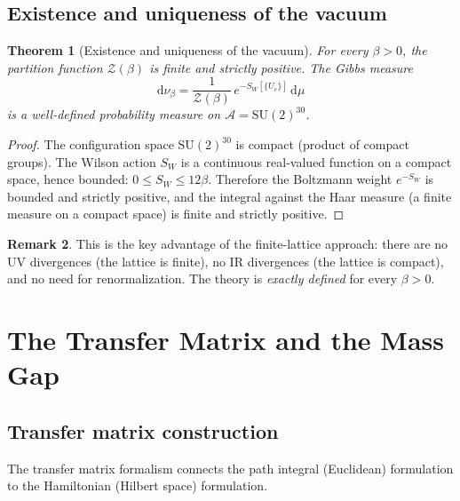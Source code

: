 \documentclass[12pt,a4paper]{article}
\newtheorem{theorem}{Theorem}[section]
\theoremstyle{definition}
\newtheorem{remark}[theorem]{Remark}
\theoremstyle{remark}
\newcommand{\SU}{\mathrm{SU}}
\newcommand{\Zcal}{\mathcal{Z}}
\begin{document}
\subsection{Existence and uniqueness of the vacuum}\label{ssec:vacuum}

\begin{theorem}[Existence and uniqueness of the vacuum]\label{thm:vacuum}
For every $\beta > 0$, the partition function $\Zcal(\beta)$ is
finite and strictly positive.  The Gibbs measure
\[
  \mathrm{d}\nu_\beta = \frac{1}{\Zcal(\beta)}\,
  e^{-S_W[\{U_e\}]}\,\mathrm{d}\mu
\]
is a well-defined probability measure on $\mathcal{A} = \SU(2)^{30}$.
\end{theorem}

\begin{proof}
The configuration space $\SU(2)^{30}$ is compact (product of compact groups).
The Wilson action $S_W$ is a continuous real-valued function on a compact
space, hence bounded: $0 \le S_W \le 12\beta$.  Therefore the
Boltzmann weight $e^{-S_W}$ is bounded and strictly positive, and the
integral against the Haar measure (a finite measure on a compact space)
is finite and strictly positive.
\end{proof}

\begin{remark}
This is the key advantage of the finite-lattice approach: there are no
UV divergences (the lattice is finite), no IR divergences (the lattice
is compact), and no need for renormalization.  The theory is
\emph{exactly defined} for every $\beta > 0$.
\end{remark}

\section{The Transfer Matrix and the Mass Gap}\label{sec:massgap}

\subsection{Transfer matrix construction}\label{ssec:transfer}

The transfer matrix formalism connects the path integral (Euclidean)
formulation to the Hamiltonian (Hilbert space) formulation.
\end{document}
